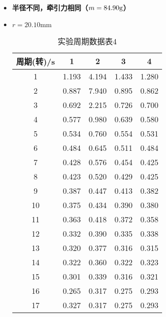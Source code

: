 \documentclass[12pt,hyperref,a4paper,UTF8]{ctexart}
\begin{document}
\begin{itemize}
        \item \textbf{半径不同，牵引力相同（$ m=84.90\text g $）}
            \item $r=20.10\text{mm}$
                \begin{table}[h!]
                    \centering
                    \begin{tabular}{ccccc}
                    \toprule
                    \textbf{周期(转)/s} & \textbf{1} & \textbf{2} & \textbf{3} & \textbf{4} \\
                    \midrule
                    1  & 1.193 & 4.194 & 1.433 & 1.280 \\
                    2  & 0.887 & 7.940 & 0.895 & 0.862 \\
                    3  & 0.692 & 2.215 & 0.726 & 0.700 \\
                    4  & 0.577 & 0.980 & 0.639 & 0.580 \\
                    5  & 0.534 & 0.760 & 0.554 & 0.531 \\
                    6  & 0.484 & 0.645 & 0.511 & 0.484 \\
                    7  & 0.428 & 0.576 & 0.454 & 0.425 \\
                    8  & 0.423 & 0.520 & 0.429 & 0.425 \\
                    9  & 0.387 & 0.447 & 0.413 & 0.382 \\
                    10 & 0.375 & 0.434 & 0.390 & 0.380 \\
                    11 & 0.363 & 0.418 & 0.372 & 0.358 \\
                    12 & 0.332 & 0.390 & 0.335 & 0.338 \\
                    13 & 0.320 & 0.377 & 0.316 & 0.315 \\
                    14 & 0.322 & 0.360 & 0.322 & 0.323 \\
                    15 & 0.301 & 0.339 & 0.316 & 0.321 \\
                    16 & 0.265 & 0.317 & 0.275 & 0.293 \\
                    17 & 0.327 & 0.317 & 0.275 & 0.293 \\
                    \bottomrule
                    \end{tabular}
                    \caption{实验周期数据表4}
                    \end{table}
                    

\end{itemize}
\end{document}
